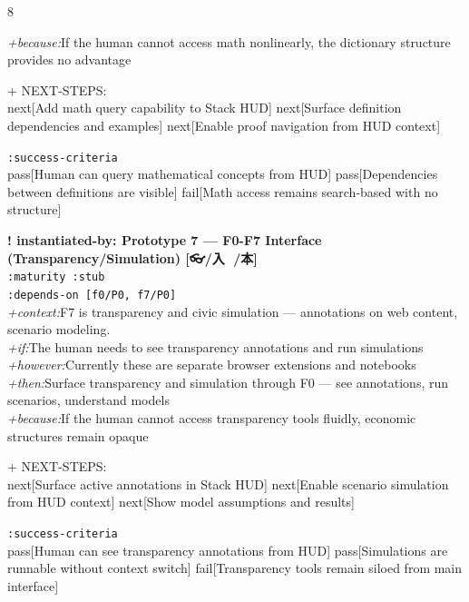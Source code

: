 \documentclass[landscape]{article}
\newcommand{\flexitag}[1]{\textcolor[gray]{0.35}{\textit{#1}}}
\newenvironment{devmapstub}{%
  \def\FrameCommand{\colorbox{devmapstubbg}}%
  \setlength{\fboxsep}{2pt}%
  \MakeFramed{\advance\hsize-\width \FrameRestore}%
}{\endMakeFramed}
\begin{document}
\begin{paracol}{8}
\begin{devmapstub}
  \flexitag{+because:}If the human cannot access math nonlinearly, the dictionary structure provides no advantage\\
\par
  + NEXT-STEPS:\\
    next[Add math query capability to Stack HUD] next[Surface definition dependencies and examples] next[Enable proof navigation from HUD context]\\
\par
  \texttt{:\allowbreak{}success-\allowbreak{}criteria}\\
    pass[Human can query mathematical concepts from HUD] pass[Dependencies between definitions are visible] fail[Math access remains search-based with no structure]\\
\par
\par
\end{devmapstub}
\begin{devmapstub}
\textbf{! instantiated-by: Prototype 7 — F0-F7 Interface (Transparency/Simulation) [👓/入 💖/本]}\\
  \texttt{:\allowbreak{}maturity :\allowbreak{}stub}\\
  \texttt{:\allowbreak{}depends-\allowbreak{}on [f0/\allowbreak{}P0,\allowbreak{} f7/\allowbreak{}P0]}\\
  \flexitag{+context:}F7 is transparency and civic simulation — annotations on web content, scenario modeling.\\
  \flexitag{+if:}The human needs to see transparency annotations and run simulations\\
  \flexitag{+however:}Currently these are separate browser extensions and notebooks\\
  \flexitag{+then:}Surface transparency and simulation through F0 — see annotations, run scenarios, understand models\\
  \flexitag{+because:}If the human cannot access transparency tools fluidly, economic structures remain opaque\\
\par
  + NEXT-STEPS:\\
    next[Surface active annotations in Stack HUD] next[Enable scenario simulation from HUD context] next[Show model assumptions and results]\\
\par
  \texttt{:\allowbreak{}success-\allowbreak{}criteria}\\
    pass[Human can see transparency annotations from HUD] pass[Simulations are runnable without context switch] fail[Transparency tools remain siloed from main interface]\\

\end{devmapstub}
\end{paracol}
\end{document}
